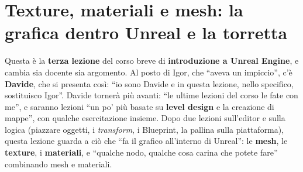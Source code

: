 %
%
%    
%

\chapter[Texture, materiali e mesh]{Texture, materiali e mesh: la grafica dentro
Unreal e la torretta}
\label{ue3:cap:materiali}

Questa è la \textbf{terza lezione} del corso breve di \textbf{introduzione a Unreal
Engine}, e cambia sia docente sia argomento. Al posto di Igor, che ``aveva un
impiccio'', c'è \textbf{Davide}, che si presenta così: ``io sono Davide e in questa
lezione, nello specifico, sostituisco Igor''. Davide tornerà più avanti: ``le ultime
lezioni del corso le fate con me'', e saranno lezioni ``un po' più basate su
\textbf{level design} e la creazione di mappe'', con qualche esercitazione insieme. Dopo
due lezioni sull'editor e sulla logica (piazzare oggetti, i \emph{transform}, i
Blueprint, la pallina sulla piattaforma), questa lezione guarda a ciò che ``fa il
grafico all'interno di Unreal'': le \textbf{mesh}, le \textbf{texture}, i
\textbf{materiali}, e ``qualche nodo, qualche cosa carina che potete fare'' combinando
mesh e materiali.

